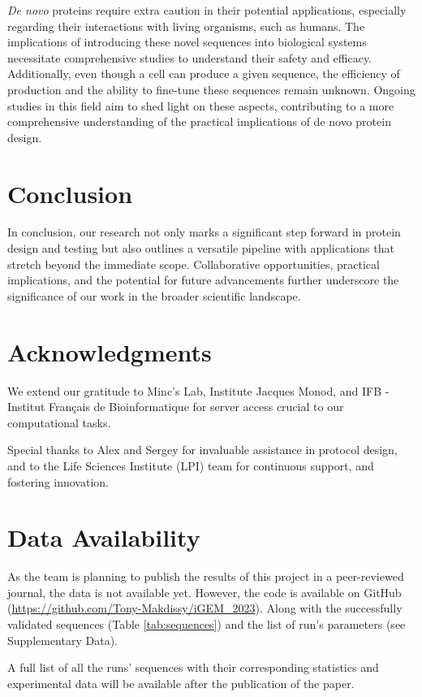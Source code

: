 \documentclass[11pt,a4paper]{article}
\begin{document}
\emph{De novo} proteins require extra caution in their potential applications, especially regarding their interactions with living organisms, such as humans. The implications of introducing these novel sequences into biological systems necessitate comprehensive studies to understand their safety and efficacy. Additionally, even though a cell can produce a given sequence, the efficiency of production and the ability to fine-tune these sequences remain unknown. Ongoing studies in this field aim to shed light on these aspects, contributing to a more comprehensive understanding of the practical implications of de novo protein design.

\section{Conclusion}

In conclusion, our research not only marks a significant step forward in protein design and testing but also outlines a versatile pipeline with applications that stretch beyond the immediate scope. Collaborative opportunities, practical implications, and the potential for future advancements further underscore the significance of our work in the broader scientific landscape.


\section*{Acknowledgments}

We extend our gratitude to Minc's Lab, Institute Jacques Monod, and IFB - Institut Français de Bioinformatique for server access crucial to our computational tasks.

Special thanks to Alex and Sergey for invaluable assistance in protocol design, and to the Life Sciences Institute (LPI) team for continuous support, and fostering innovation.


\section*{Data Availability}

As the team is planning to publish the results of this project in a peer-reviewed journal, the data is not available yet. However, the code is available on GitHub (\url{https://github.com/Tony-Makdissy/iGEM_2023}). Along with the successfully validated sequences (Table \ref{tab:sequences}) and the list of run's parameters (see Supplementary Data).

A full list of all the runs' sequences with their corresponding statistics and experimental data will be available after the publication of the paper.
\end{document}
